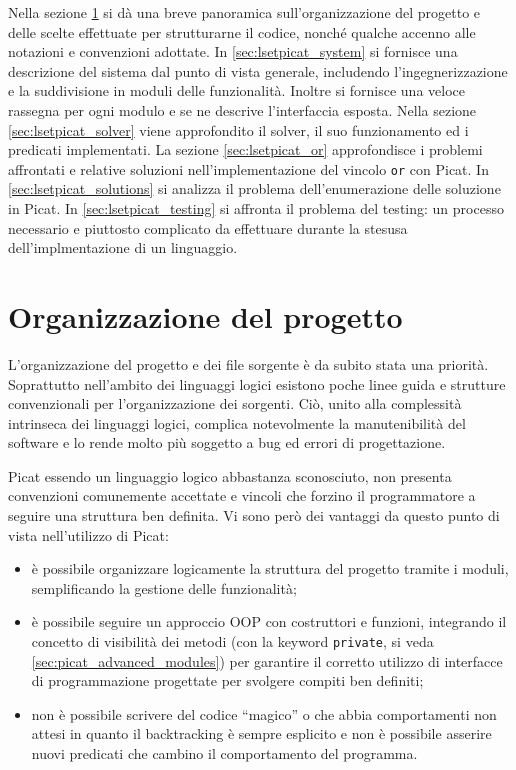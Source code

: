 \documentclass[12pt,a4paper,openright]{book} %
\begin{document}
\minitoc

Nella sezione \ref{sec:lsetpicat_project} si dà una breve panoramica sull'organizzazione del progetto e delle scelte effettuate per strutturarne il codice, nonché qualche accenno alle notazioni e convenzioni adottate. In \ref{sec:lsetpicat_system} si fornisce una descrizione del sistema dal punto di vista generale, includendo l'ingegnerizzazione e la suddivisione in moduli delle funzionalità. Inoltre si fornisce una veloce rassegna per ogni modulo e se ne descrive l'interfaccia esposta. Nella sezione \ref{sec:lsetpicat_solver} viene approfondito il solver, il suo funzionamento ed i predicati implementati. La sezione \ref{sec:lsetpicat_or} approfondisce i problemi affrontati e relative soluzioni nell'implementazione del vincolo \texttt{or} con Picat. In \ref{sec:lsetpicat_solutions} si analizza il problema dell'enumerazione delle soluzione in Picat. In \ref{sec:lsetpicat_testing} si affronta il problema del testing: un processo necessario e piuttosto complicato da effettuare durante la stesusa dell'implmentazione di un linguaggio.

\section{Organizzazione del progetto}
\label{sec:lsetpicat_project}

L'organizzazione del progetto e dei file sorgente è da subito stata una priorità. Soprattutto nell'ambito dei linguaggi logici esistono poche linee guida e strutture convenzionali per l'organizzazione dei sorgenti. Ciò, unito alla complessità intrinseca dei linguaggi logici, complica notevolmente la manutenibilità del software e lo rende molto più soggetto a bug ed errori di progettazione.

Picat essendo un linguaggio logico abbastanza sconosciuto, non presenta convenzioni comunemente accettate e vincoli che forzino il programmatore a seguire una struttura ben definita. Vi sono però dei vantaggi da questo punto di vista nell'utilizzo di Picat: 
\begin{itemize}
	\item è possibile organizzare logicamente la struttura del progetto tramite i moduli, semplificando la gestione delle funzionalità;
	\item è possibile seguire un approccio OOP con costruttori e funzioni, integrando il concetto di visibilità dei metodi (con la keyword \texttt{private}, si veda \ref{sec:picat_advanced_modules}) per garantire il corretto utilizzo di interfacce di programmazione progettate per svolgere compiti ben definiti;
	\item non è possibile scrivere del codice ``magico'' o che abbia comportamenti non attesi in quanto il backtracking è sempre esplicito e non è possibile asserire nuovi predicati che cambino il comportamento del programma.
\end{itemize}
\end{document}

